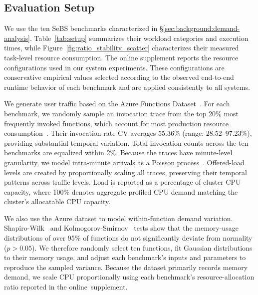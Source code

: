 \vspace{-10pt}
\subsection{Evaluation Setup}
\vspace{-5pt}
\label{sec:experiments_setup}

We use the ten SeBS benchmarks characterized in
\S\ref{sec:background:demand-analysis}. Table~\ref{tab:setup} summarizes their
workload categories and execution times, while
Figure~\ref{fig:ratio_stability_scatter} characterizes their measured task-level
resource consumption. The online supplement reports the resource configurations
used in our system experiments. These configurations are
conservative empirical values selected according to the observed end-to-end
runtime behavior of each benchmark and are applied consistently to all systems.

 We generate user traffic based on the 
Azure Functions Dataset~\cite{ShahradFGCBCLTR20}. For each benchmark, we randomly 
sample an invocation trace from the top 20\% most frequently invoked functions,
which account for most production resource consumption~\cite{ShahradFGCBCLTR20}. 
Their invocation-rate CV averages 55.36\% (range: 28.52--97.23\%), providing 
substantial temporal variation. Total invocation counts across the ten benchmarks 
are equalized within 2\%. Because the traces have minute-level granularity, we 
model intra-minute arrivals as a Poisson process~\cite{Gallager2013Stochastic}. 
Offered-load levels are created by proportionally scaling all traces, preserving 
their temporal patterns across traffic levels. Load is reported as a percentage
of cluster CPU capacity, where 100\% denotes aggregate profiled CPU demand
matching the cluster's allocatable CPU capacity.

We also use the Azure dataset to model within-function demand variation.
Shapiro-Wilk~\cite{SHAPIRO1965} and Kolmogorov-Smirnov~\cite{f4feef4d-12ae-314a-a10b-d1f2768e819a}
tests show that the memory-usage distributions of over 95\% of functions do not
significantly deviate from normality ($p>0.05$). We therefore randomly select ten
functions, fit Gaussian distributions to their memory usage, and adjust each
benchmark's inputs and parameters to reproduce the sampled variance. Because the
dataset primarily records memory demand, we scale CPU proportionally using each
benchmark's resource-allocation ratio reported in the online~supplement.

